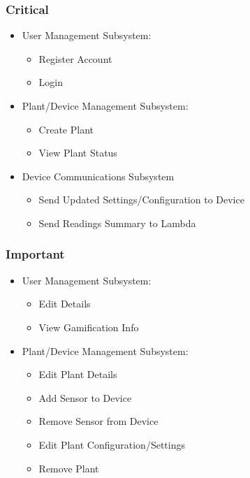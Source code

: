 \documentclass{article}
\begin{document}
		\subsubsection{Critical}
			\begin{itemize}
				\item User Management Subsystem:
				\begin{itemize}
					\item Register Account
					\item Login
				\end{itemize}
				
				\item Plant/Device Management Subsystem:
				\begin{itemize}
					\item Create Plant
					\item View Plant Status
				\end{itemize}
				
				\item Device Communications Subsystem
				\begin{itemize}
					\item Send Updated Settings/Configuration to Device
					\item Send Readings Summary to Lambda
				\end{itemize}
			\end{itemize}
			
		\subsubsection{Important}
		\begin{itemize}
			\item User Management Subsystem:
			\begin{itemize}
				\item Edit Details
				\item View Gamification Info
			\end{itemize}
			
			\item Plant/Device Management Subsystem:
			\begin{itemize}
				\item Edit Plant Details
				\item Add Sensor to Device
				\item Remove Sensor from Device
				\item Edit Plant Configuration/Settings
				\item Remove Plant
			\end{itemize}
		\end{itemize}
	
\end{document}
